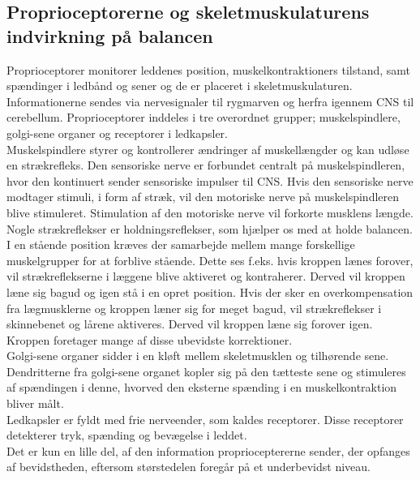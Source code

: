\subsection{Proprioceptorerne og skeletmuskulaturens indvirkning på balancen}
Proprioceptorer monitorer leddenes position, muskelkontraktioners tilstand, samt spændinger i ledbånd og sener og de er placeret i skeletmuskulaturen. Informationerne sendes via nervesignaler til rygmarven og herfra igennem CNS til cerebellum. Proprioceptorer inddeles i tre overordnet grupper; muskelspindlere, golgi-sene organer og receptorer i ledkapsler.\cite{Martini2012}    \\
Muskelspindlere styrer og kontrollerer ændringer af muskellængder og kan udløse en strækrefleks. Den sensoriske nerve er forbundet centralt på muskelspindleren, hvor den kontinuert sender sensoriske impulser til CNS. Hvis den sensoriske nerve modtager stimuli, i form af stræk, vil den motoriske nerve på muskelspindleren blive stimuleret. Stimulation af den motoriske nerve vil forkorte musklens længde. Nogle strækreflekser er holdningsreflekser, som hjælper os med at holde balancen. I en stående position kræves der samarbejde mellem mange forskellige muskelgrupper for at forblive stående. Dette ses f.eks. hvis kroppen lænes forover, vil strækreflekserne i læggene blive aktiveret og kontraherer. Derved vil kroppen læne sig bagud og igen stå i en opret position. Hvis der sker en overkompensation fra lægmusklerne og kroppen læner sig for meget bagud, vil strækreflekser i skinnebenet og lårene aktiveres. Derved vil kroppen læne sig forover igen. Kroppen foretager mange af disse ubevidste korrektioner. \cite{Martini2012}   \\ %
Golgi-sene organer sidder i en kløft mellem skeletmusklen og tilhørende sene. Dendritterne fra golgi-sene organet kopler sig på den tætteste sene og stimuleres af spændingen i denne, hvorved den eksterne spænding i en muskelkontraktion bliver målt. \cite{Martini2012}    \\
Ledkapsler er fyldt med frie nerveender, som kaldes receptorer. Disse receptorer detekterer tryk, spænding og bevægelse i leddet. \cite{Martini2012}    \\
Det er kun en lille del, af den information proprioceptererne sender, der opfanges af bevidstheden, eftersom størstedelen foregår på et underbevidst niveau.\cite{Martini2012} \\

